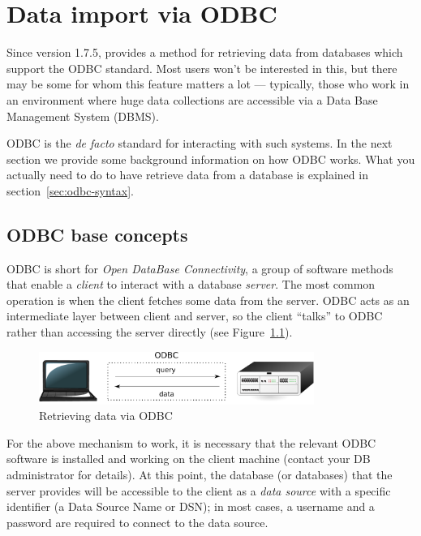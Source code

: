 \chapter{Data import via ODBC}
\label{chap:odbc}

Since version 1.7.5,  provides a method for retrieving data
from databases which support the ODBC standard. Most users won't be
interested in this, but there may be some for whom this feature
matters a lot --- typically, those who work in an environment where
huge data collections are accessible via a Data Base Management System
(DBMS).

ODBC is the \emph{de facto} standard for interacting with such
systems. In the next section we provide some background information on
how ODBC works. What you actually need to do to have 
retrieve data from a database is explained in
section~\ref{sec:odbc-syntax}.

\section{ODBC base concepts}
\label{sec:odbc-base}

ODBC is short for \emph{Open DataBase Connectivity}, a group of
software methods that enable a \emph{client} to interact with a
database \emph{server}. The most common operation is when the client
fetches some data from the server. ODBC acts as an intermediate layer
between client and server, so the client ``talks'' to ODBC rather than
accessing the server directly (see Figure~\ref{fig:odbc}).

\begin{figure}[htbp]
  \centering
  \includegraphics[width=0.8\textwidth]{figures/odbc}
  \caption{Retrieving data via ODBC}
  \label{fig:odbc}
\end{figure}

For the above mechanism to work, it is necessary that the relevant
ODBC software is installed and working on the client machine (contact
your DB administrator for details). At this point, the database (or
databases) that the server provides will be accessible to the client
as a \emph{data source} with a specific identifier (a Data Source Name
or DSN); in most cases, a username and a password are required to
connect to the data source.

